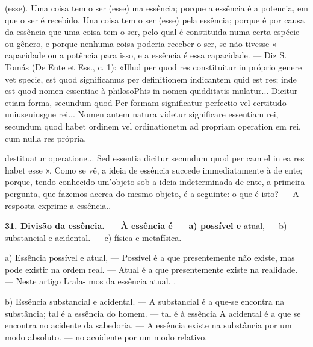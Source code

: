 \documentclass[12pt,a4paper]{article}
\newcommand{\pagmark}[1]{\quad[\textit{p.\,#1}]\quad}
\begin{document}
{{(esse). Uma coisa tem o ser (esse) ma essência; porque a essência é a potencia, em que o ser é recebido. Una coisa tem o ser (esse) pela essência; porque é por causa da essência que uma coisa tem o ser, pelo qual é constituida numa certa espécie ou gênero, e porque nenhuma coisa poderia receber
o ser, se não tivesse « capacidade ou a potência para isso,
 e a essência é
essa capacidade. — Diz S. Tomás (De Ente et Ess., c. 1): «Illud per quod
res constituitur in próprio genere vet specie, est quod significamus per
 definitionem indicantem quid est res; inde est quod nomen essentiae à philosoPhis in nomen quidditatis mulatur... Dicitur etiam forma,
 secundum quod
Per formam significatur perfectio vel certitudo
 uniuseuiusgue rei... Nomen
autem natura videtur significare essentiam rei,
 secundum quod habet ordinem vel ordinationetm ad propriam operation
 em rei, cum nulla res própria,

\pagmark{304}
destituatur operatione... Sed essentia dicitur secundum quod per cam el
 in ea res habet esse ».
 Como se vê, a ideia de essência succede immediatamente à de ente;
 porque, tendo conhecido um'objeto sob a ideia indeterminada de ente, a
 primeira pergunta, que fazemos acerca do mesmo objeto, é a seguinte: o
 que é isto? — A resposta exprime a essência.. 

\pagmark{304}

\medskip\noindent\textbf{31. Divisão da essência. — À essência é — a) possível e}
atual, — b) substancial e acidental. — c) física e metafísica.

     \medskip\noindent a) Essência possível e atual, — Possível é a que presentemente não existe, mas pode existir na ordem real. — Atual é
a que presentemente existe na realidade. — Neste artigo Lrala-
 mos da essência atual. .

     \medskip\noindent b) Essência substancial e acidental. — A substancial é a
que-se encontra na substância; tal é a essência do homem. —
 tal é à essência
 A acidental é a que se encontra no acidente
 da sabedoria, — A essência existe na substância por um modo
absoluto. — no acoidente por um modo relativo.

}}
\end{document}
